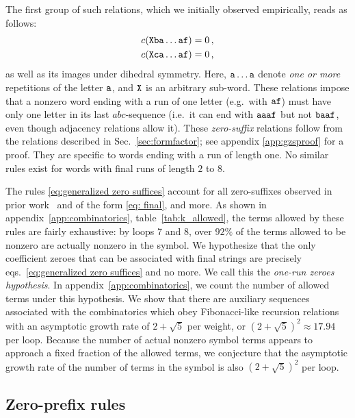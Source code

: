 \documentclass[12pt]{article}
\begin{document}
The first group of such relations, which we initially observed empirically, reads as follows:
\begin{equation}
\label{eq:generalized zero suffices}
    \begin{aligned}
        c({\tt X ba\dots af})=0\,,\\
        c({\tt X ca\dots af})=0\,,\\    
    \end{aligned}
\end{equation}
as well as its images under dihedral symmetry. Here, ${\tt a\dots a}$ denote \emph{one or more} repetitions of the letter ${\tt a}$, and ${\tt X}$ is an arbitrary sub-word. These relations impose that a nonzero word ending with a run of one letter (e.g.\ with ${\tt af}$) must have only one letter in its last $abc$-sequence (i.e.\ it can end with ${\tt aaaf}$ but not ${\tt baaf}$, even though adjacency relations allow it). These \emph{zero-suffix} relations follow from the relations described in Sec.~\ref{sec:formfactor}; see appendix \ref{app:gzsproof} for a proof.
They are specific to words ending with a run of length one. No similar rules exist for words with final runs of length $2$ to $8$.  

The rules \eqref{eq:generalized zero suffices} account for all zero-suffixes observed in prior work~\citep{Dixon:2022rse} and of the form \eqref{eq: final}, and more.  As shown in appendix~\ref{app:combinatorics}, table~\ref{tab:k_allowed}, the terms allowed by these rules are fairly exhaustive: by loops 7 and 8, over $92\%$ of the terms allowed to be nonzero are actually nonzero in the symbol.  We hypothesize that the only coefficient zeroes that can be associated with final strings are precisely eqs.~\eqref{eq:generalized zero suffices} and no more. We call this the \emph{one-run zeroes hypothesis}. In appendix~\ref{app:combinatorics}, we count the number of allowed terms under this hypothesis.   We show that there are auxiliary sequences associated with the combinatorics which obey Fibonacci-like recursion relations with an asymptotic growth rate of $2+\sqrt{5}$ per weight, or $(2+\sqrt{5})^2 \approx 17.94$ per loop.  Because the number of actual nonzero symbol terms appears to approach a fixed fraction of the allowed terms, we conjecture that the asymptotic growth rate of the number of terms in the symbol is also $(2+\sqrt{5})^2$ per loop.

\subsection{Zero-prefix rules}
\label{sec:zeroprefix}
\end{document}
